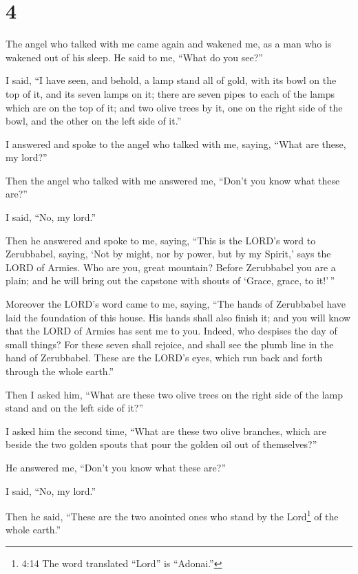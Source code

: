\hypertarget{section-3}{%
\section{4}\label{section-3}}

 The angel who talked with me came again and wakened me, as
a man who is wakened out of his sleep.  He said to me,
``What do you see?''

I said, ``I have seen, and behold, a lamp stand all of gold, with its
bowl on the top of it, and its seven lamps on it; there are seven pipes
to each of the lamps which are on the top of it;  and two
olive trees by it, one on the right side of the bowl, and the other on
the left side of it.''

 I answered and spoke to the angel who talked with me,
saying, ``What are these, my lord?''

 Then the angel who talked with me answered me, ``Don't you
know what these are?''

I said, ``No, my lord.''

 Then he answered and spoke to me, saying, ``This is the
LORD's word to Zerubbabel, saying, `Not by might, nor by power, but by
my Spirit,' says the LORD of Armies.  Who are you, great
mountain? Before Zerubbabel you are a plain; and he will bring out the
capstone with shouts of `Grace, grace, to it!'\,''

 Moreover the LORD's word came to me, saying, 
``The hands of Zerubbabel have laid the foundation of this house. His
hands shall also finish it; and you will know that the LORD of Armies
has sent me to you.  Indeed, who despises the day of small
things? For these seven shall rejoice, and shall see the plumb line in
the hand of Zerubbabel. These are the LORD's eyes, which run back and
forth through the whole earth.''

 Then I asked him, ``What are these two olive trees on the
right side of the lamp stand and on the left side of it?''

 I asked him the second time, ``What are these two olive
branches, which are beside the two golden spouts that pour the golden
oil out of themselves?''

 He answered me, ``Don't you know what these are?''

I said, ``No, my lord.''

 Then he said, ``These are the two anointed ones who stand
by the Lord\footnote{4:14 The word translated ``Lord'' is ``Adonai.''}
of the whole earth.''

